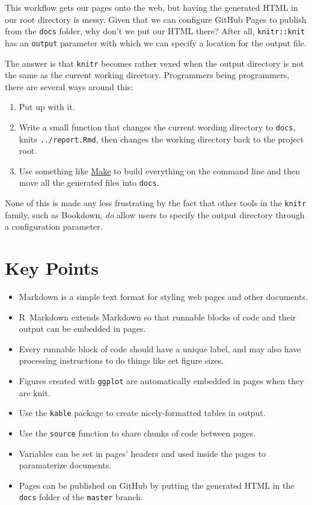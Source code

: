 This workflow gets our pages onto the web,
but having the generated HTML in our root directory is messy.
Given that we can configure GitHub Pages to publish from the \texttt{docs} folder,
why don't we put our HTML there?
After all,
\texttt{knitr::knit} has an \texttt{output} parameter with which we can specify a location for the output file.

The answer is that \texttt{knitr} becomes rather vexed when the output directory is not the same as
the current working directory.
Programmers being programmers,
there are several ways around this:

\begin{enumerate}
\item
  Put up with it.
\item
  Write a small function that changes the current wording directory to \texttt{docs},
  knits \texttt{../report.Rmd},
  then changes the working directory back to the project root.
\item
  Use something like \href{https://www.gnu.org/software/make/}{Make} to build everything on the command line
  and then move all the generated files into \texttt{docs}.
\end{enumerate}

None of this is made any less frustrating by the fact that other tools in the \texttt{knitr} family,
such as Bookdown,
\emph{do} allow users to specify the output directory through a configuration parameter.

\section{Key Points}

\begin{itemize}
\item
  Markdown is a simple text format for styling web pages and other documents.
\item
  R~Markdown extends Markdown so that runnable blocks of code and their output can be embedded in pages.
\item
  Every runnable block of code should have a unique label,
  and may also have processing instructions to do things like set figure sizes.
\item
  Figures created with \texttt{ggplot} are automatically embedded in pages when they are knit.
\item
  Use the \texttt{kable} package to create nicely-formatted tables in output.
\item
  Use the \texttt{source} function to share chunks of code between pages.
\item
  Variables can be set in pages' headers and used inside the pages to paramaterize documents.
\item
  Pages can be published on GitHub by putting the generated HTML in the \texttt{docs} folder of the \texttt{master} branch.
\end{itemize}

